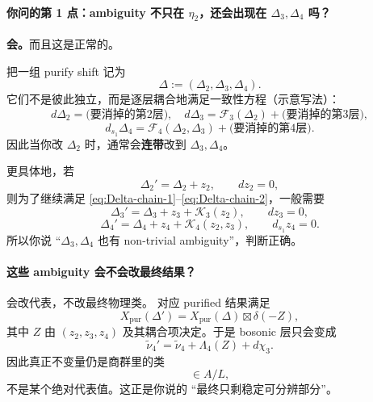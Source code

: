 \documentclass[a4paper,fontset=ubuntu,12pt]{ctexart}
\begin{document}
\paragraph{你问的第 1 点：ambiguity 不只在 $\eta_2$，还会出现在 $\Delta_3,\Delta_4$ 吗？}
\textbf{会。}而且这是正常的。

把一组 purify shift 记为
\begin{equation}
\Delta:=(\Delta_2,\Delta_3,\Delta_4).
\label{eq:Delta-tuple}
\end{equation}
它们不是彼此独立，而是逐层耦合地满足一致性方程（示意写法）：
\begin{equation}
d\Delta_2=\text{(要消掉的第2层)},\quad
d\Delta_3=\mathcal{F}_3(\Delta_2)+\text{(要消掉的第3层)},
\label{eq:Delta-chain-1}
\end{equation}
\begin{equation}
d_{s_1}\Delta_4=\mathcal{F}_4(\Delta_2,\Delta_3)+\text{(要消掉的第4层)}.
\label{eq:Delta-chain-2}
\end{equation}
因此当你改 $\Delta_2$ 时，通常会\textbf{连带}改到 $\Delta_3,\Delta_4$。

更具体地，若
\begin{equation}
\Delta_2'=\Delta_2+z_2,\qquad dz_2=0,
\label{eq:Delta2-shift}
\end{equation}
则为了继续满足 \eqref{eq:Delta-chain-1}--\eqref{eq:Delta-chain-2}，一般需要
\begin{equation}
\Delta_3'=\Delta_3+z_3+\mathcal{K}_3(z_2),\qquad dz_3=0,
\label{eq:Delta3-shift}
\end{equation}
\begin{equation}
\Delta_4'=\Delta_4+z_4+\mathcal{K}_4(z_2,z_3),\qquad d_{s_1}z_4=0.
\label{eq:Delta4-shift}
\end{equation}
所以你说 ``$\Delta_3,\Delta_4$ 也有 non-trivial ambiguity''，判断正确。

\paragraph{这些 ambiguity 会不会改最终结果？}
会改代表，不改最终物理类。  
对应 purified 结果满足
\begin{equation}
X_{\mathrm{pur}}(\Delta')=X_{\mathrm{pur}}(\Delta)\boxtimes \delta(-Z),
\label{eq:pur-ambiguity-general}
\end{equation}
其中 $Z$ 由 $(z_2,z_3,z_4)$ 及其耦合项决定。于是 bosonic 层只会变成
\begin{equation}
\widetilde{\nu}_4'=\widetilde{\nu}_4+\Lambda_4(Z)+d\chi_3.
\label{eq:nu4-ambiguity-general}
\end{equation}
因此真正不变量仍是商群里的类
\begin{equation}
[\widetilde{\nu}_4]\in A/L,
\label{eq:A-mod-L}
\end{equation}
不是某个绝对代表值。这正是你说的 ``最终只剩稳定可分辨部分''。
\end{document}
